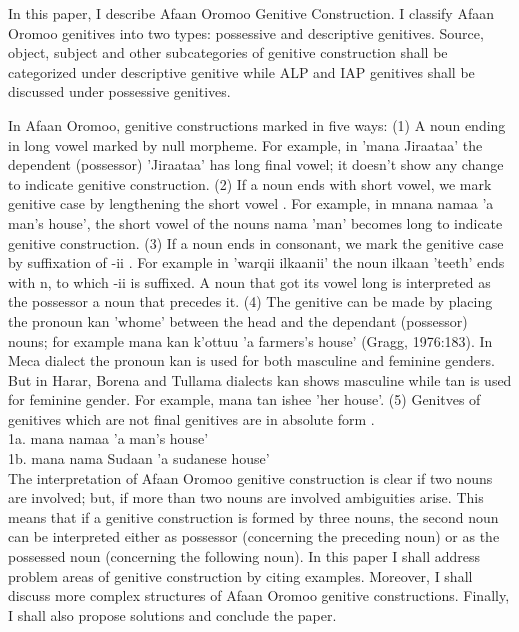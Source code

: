 \documentclass[11pt,a4paper]{article}
\begin{document}
	In this paper, I describe Afaan Oromoo Genitive Construction. I classify Afaan Oromoo genitives into two types: possessive and descriptive genitives. Source, object, subject and other subcategories of genitive construction shall be categorized under descriptive genitive while ALP and IAP genitives shall be discussed under possessive genitives.
	
	In Afaan Oromoo, genitive constructions marked in five ways: (1) A noun ending in long vowel marked by null morpheme. For example, in ’mana Jiraataa’ the dependent (possessor) ’Jiraataa’ has long final vowel; it doesn’t show any change to indicate genitive construction. (2) If a noun ends with short vowel, we mark genitive case by lengthening the short vowel \cite[p,183]{gragg1976oromo}. For example, in mnana namaa ’a man’s house’, the short vowel of the nouns nama ’man’ becomes long to indicate genitive construction. (3) If a noun ends in consonant, we mark the genitive case by suffixation of -ii \cite{gobena2019verb}. For example in ’warqii ilkaanii’ the noun ilkaan ’teeth’ ends with n, to which -ii is suffixed. A noun that got its vowel long is interpreted as the possessor a noun that precedes it. (4) The genitive can be made by placing the pronoun kan ’whome’ between the head and the dependant (possessor) nouns; for example mana kan k’ottuu ’a farmers’s house’ (Gragg, 1976:183). In Meca dialect the pronoun kan is used for both masculine and feminine genders. But in Harar, Borena and Tullama dialects kan shows masculine while tan is used for feminine gender. For example, mana tan ishee ’her house’. (5) Genitves of genitives which are not final genitives are in absolute form \cite{owens1985grammar}. \\	
	
	\indent 1a. mana namaa ’a man’s house’\\
	\indent 1b. mana nama Sudaan ’a sudanese house’ \\
	
	The interpretation of Afaan Oromoo genitive construction is clear if two nouns are involved; but, if more than two nouns are involved ambiguities arise. This means that if a genitive construction is formed by three nouns, the second noun can be interpreted either as possessor (concerning the preceding noun) or as the possessed noun (concerning the following noun). In this paper I shall address problem areas of genitive construction by citing examples. Moreover, I shall discuss more complex structures of Afaan Oromoo genitive constructions. Finally, I shall also propose solutions and conclude the paper. 
	
\end{document}
